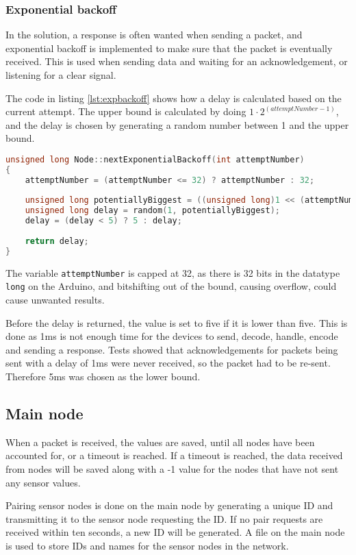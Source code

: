 \subsubsection*{Exponential backoff}
In the solution, a response is often wanted when sending a packet, and exponential backoff is implemented to make sure that the packet is eventually received. This is used when sending data and waiting for an acknowledgement, or listening for a clear signal.

The code in listing \ref{lst:expbackoff} shows how a delay is calculated based on the current attempt.
The upper bound is calculated by doing $1 \cdot 2^{(attemptNumber-1)}$, and the delay is chosen by generating a random number between 1 and the upper bound.

\begin{lstlisting}[language=C,caption={Exponential backoff on the sensor nodes. In Node.cpp.},label={lst:expbackoff}]
unsigned long Node::nextExponentialBackoff(int attemptNumber)
{
    attemptNumber = (attemptNumber <= 32) ? attemptNumber : 32;
    
    unsigned long potentiallyBiggest = ((unsigned long)1 << (attemptNumber - 1));
    unsigned long delay = random(1, potentiallyBiggest);
    delay = (delay < 5) ? 5 : delay;
    
    return delay;
}
\end{lstlisting}
The variable \texttt{attemptNumber} is capped at 32, as there is 32 bits in the datatype \texttt{long} on the Arduino, and bitshifting out of the bound, causing overflow, could cause unwanted results.

Before the delay is returned, the value is set to five if it is lower than five. This is done as 1ms is not enough time for the devices to send, decode, handle, encode and sending a response. Tests showed that acknowledgements for packets being sent with a delay of 1ms were never received, so the packet had to be re-sent. Therefore 5ms was chosen as the lower bound.

\subsection{Main node} \label{cha:signalhandling}
When a packet is received, the values are saved, until all nodes have been accounted for, or a timeout is reached. If a timeout is reached, the data received from nodes will be saved along with a -1 value for the nodes that have not sent any sensor values.

Pairing sensor nodes is done on the main node by generating a unique ID and transmitting it to the sensor node requesting the ID. If no pair requests are received within ten seconds, a new ID will be generated. A file on the main node is used to store IDs and names for the sensor nodes in the network.


